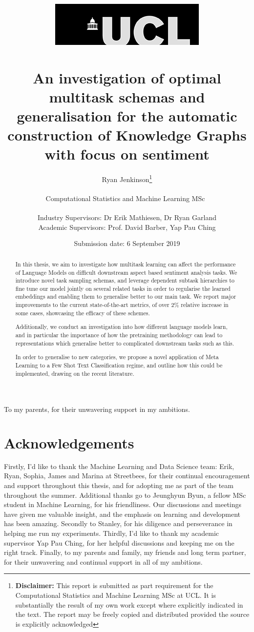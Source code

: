 \documentclass[11pt]{report}
\title{  	{ \includegraphics[scale=.5]{ucl_logo.png}}\\
{{\Huge \thesistitle}}\\
{\large An investigation of optimal multitask schemas and generalisation for the automatic construction of Knowledge Graphs with focus on sentiment}\\
		}
\date{Submission date: 6 September 2019}
\author{Ryan Jenkinson\thanks{
{\bf Disclaimer:}
This report is submitted as part requirement for the Computational Statistics and Machine Learning MSc at UCL. It is substantially the result of my own work except where explicitly indicated in the text. The report may be freely copied and distributed provided the source is explicitly acknowledged}
\\ \\
Computational Statistics and Machine Learning MSc\ \\ \\
Industry Supervisors: Dr Erik Mathiesen, Dr Ryan Garland \\
Academic Supervisors: Prof. David Barber, Yap Pau Ching
}
\theoremstyle{Definition}
\theoremstyle{remark}
\begin{document}
\onehalfspacing
\maketitle



\null{}
\begin{flushright}
	To my parents, for their unwavering support in my ambitions.
\end{flushright}
\null
\thispagestyle{empty}
\newpage

\chapter*{Acknowledgements}
Firstly, I'd like to thank the Machine Learning and Data Science team: Erik, Ryan, Sophia, James and Marina at Streetbees, for their continual encouragement and support throughout this thesis, and for adopting me as part of the team throughout the summer. Additional thanks go to Jeunghyun Byun, a fellow MSc student in Machine Learning, for his friendliness. Our discussions and meetings have given me valuable insight, and the emphasis on learning and development has been amazing. Secondly to Stanley, for his diligence and perseverance in helping me run my experiments. Thirdly, I'd like to thank my academic supervisor Yap Pau Ching, for her helpful discussions and keeping me on the right track. Finally, to my parents and family, my friends and long term partner, for their unwavering and continual support in all of my ambitions.

\newpage
\begin{abstract}
In this thesis, we aim to investigate how multitask learning can affect the performance of Language Models on difficult downstream aspect based sentiment analysis tasks. We introduce novel task sampling schemas, and leverage dependent subtask hierarchies to fine tune our model jointly on several related tasks in order to regularise the learned embeddings and enabling them to generalise better to our main task. We report major improvements to the current state-of-the-art metrics, of over 2\% relative increase in some cases, showcasing the efficacy of these schemes. 

Additionally, we conduct an investigation into how different language models learn, and in particular the importance of how the pretraining methodology can lead to representations which generalise better to complicated downstream tasks such as this.

In order to generalise to new categories, we propose a novel application of Meta Learning to a Few Shot Text Classification regime, and outline how this could be implemented, drawing on the recent literature.
\end{abstract}
\newpage 
\end{document}
